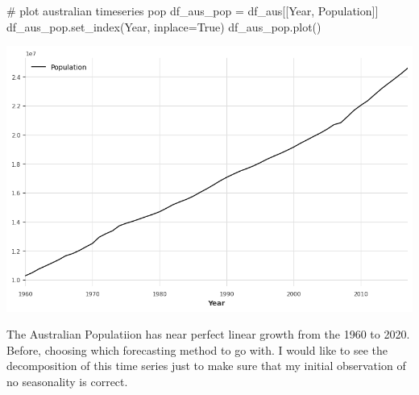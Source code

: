\documentclass[
  11pt,
]{article}
\newenvironment{Shaded}{\begin{snugshade}}{\end{snugshade}}
\newcommand{\CommentTok}[1]{\textcolor[rgb]{0.37,0.37,0.37}{#1}}
\newcommand{\NormalTok}[1]{\textcolor[rgb]{0.00,0.23,0.31}{#1}}
\newcommand{\OperatorTok}[1]{\textcolor[rgb]{0.37,0.37,0.37}{#1}}
\newcommand{\StringTok}[1]{\textcolor[rgb]{0.13,0.47,0.30}{#1}}
\newcommand{\VariableTok}[1]{\textcolor[rgb]{0.07,0.07,0.07}{#1}}
\begin{document}
\begin{Shaded}
\begin{Highlighting}[]
\CommentTok{\# plot australian timeseries pop}
\NormalTok{df\_aus\_pop }\OperatorTok{=}\NormalTok{ df\_aus[[}\StringTok{\textquotesingle{}Year\textquotesingle{}}\NormalTok{, }\StringTok{\textquotesingle{}Population\textquotesingle{}}\NormalTok{]]}
\NormalTok{df\_aus\_pop.set\_index(}\StringTok{\textquotesingle{}Year\textquotesingle{}}\NormalTok{, inplace}\OperatorTok{=}\VariableTok{True}\NormalTok{)}
\NormalTok{df\_aus\_pop.plot()}
\end{Highlighting}
\end{Shaded}

\includegraphics{hw3_files/figure-pdf/cell-6-output-1.png}

The Australian Populatiion has near perfect linear growth from the 1960
to 2020. Before, choosing which forecasting method to go with. I would
like to see the decomposition of this time series just to make sure that
my initial observation of no seasonality is correct.
\end{document}
